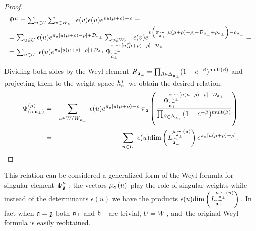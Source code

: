 \begin{proof}
\begin{equation*}
\begin{array}{l}
\Psi^{\mu }=\sum_{u\in U}\sum_{v\in W_{\af_{\perp }}}
\epsilon (v)\epsilon (u)e^{vu(\mu +\rho )-\rho }= \\
=\sum_{u\in U}\epsilon (u)e^{\pi _{\af}\left[ u(\mu +\rho )-\rho \right]
+\mathcal{D}_{\af_{\perp }}}\sum_{v\in W_{\af_{\perp }}}\epsilon
(v)e^{v\left( \pi _{ \widetilde{\af_{\perp }} }\left[
u(\mu +\rho )-\rho \right] -\mathcal{D}_{\af_{\perp }}+\rho _{\af%
_{\perp }}\right) -\rho _{\af_{\perp }}}= \\
=\sum_{u\in U}\;\epsilon (u)e^{\pi _{\af }\left[ u(\mu
+\rho )-\rho \right] +\mathcal{D}_{\af_{\perp }}}\Psi _{\widetilde{%
\af_{\perp }}}^{\pi _{ \widetilde{\af_{\perp }} }%
\left[ u(\mu +\rho )-\rho \right] -\mathcal{D}_{\af_{\perp }}}
\end{array}
\end{equation*}

Dividing both sides by the Weyl element $R_{\mathfrak{a}_{\perp }}=\prod_{\beta
\in \Delta _{\mathfrak{a}_{\perp }}}(1-e^{-\beta })^{\mathrm{mult}(\beta )}$ and
projecting them to the weight space $h_{\mathfrak{a}}^{\ast }$\ we obtain the
desired relation:
\begin{eqnarray*}
\Psi ^{\left( \mu \right) }_{\left(  \af, \afb \right)}
&=&\sum_{u\in W/W_{\af_{\perp }}}\;\epsilon (u)e^{\pi _{\frak{a%
}}\left[ u(\mu +\rho )-\rho \right] }\pi _{%
\af}\left( \frac{\Psi _{\widetilde{\af_{\perp }}}^{\pi _{
\widetilde{\af_{\perp }} }\left[ u(\mu +\rho )-\rho \right] -%
\mathcal{D}_{\af_{\perp }}}}{\prod_{\beta \in \Delta _{\af_{\perp
}}}(1-e^{-\beta })^{\mathrm{mult}(\beta )}}\right)  \\
&=&\sum_{u\in U}\;\epsilon (u)\mathrm{\dim }\left( L_{\widetilde{\af%
_{\perp }}}^{\mu _{\widetilde{\af_{\perp }}}\left( u\right) }\right)
e^{\pi _{\af}\left[ u(\mu +\rho )-\rho \right] }.
\end{eqnarray*}
\end{proof}


\begin{remark}
This relation can be considered a generalized form of the Weyl formula for singular
element $\Psi _{\frak{g}}^{\mu }$ : the vectors $\mu _{\mathfrak{a}}\left(
u\right) $ play the role of singular weights while instead of the determinants $%
\epsilon (u)$ we have the products $\epsilon (u)\mathrm{\dim }\left( L_{%
\widetilde{\af_{\perp }}}^{\mu _{\widetilde{\af_{\perp }}}\left(
u\right) }\right) .$ In fact when $\frak{a=g}$ both $\mathfrak{a}_{\perp }$ and $%
\frak{h}_{\perp }$ are trivial, $U=W$ , and\ the original Weyl formula is
easily reobtained.
\end{remark}

